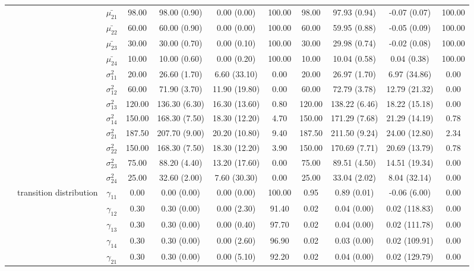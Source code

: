 \begin{table}[h]
{\begin{tabular}{ccccccccccc}
 &  & $\bar{\mu_{21}}$ & 98.00 & 98.00 (0.90) & 0.00 (0.00) & 100.00 & 98.00 & 97.93 (0.94) & -0.07 (0.07) & 100.00 \\
 &  & $\bar{\mu_{22}}$ & 60.00 & 60.00 (0.90) & 0.00 (0.00) & 100.00 & 60.00 & 59.95 (0.88) & -0.05 (0.09) & 100.00 \\
 &  & $\bar{\mu_{23}}$ & 30.00 & 30.00 (0.70) & 0.00 (0.10) & 100.00 & 30.00 & 29.98 (0.74) & -0.02 (0.08) & 100.00 \\
 &  & $\bar{\mu_{24}}$ & 10.00 & 10.00 (0.60) & 0.00 (0.20) & 100.00 & 10.00 & 10.04 (0.58) & 0.04 (0.38) & 100.00 \\
 &  & $\sigma^2_{11}$ & 20.00 & 26.60 (1.70) & 6.60 (33.10) & 0.00 & 20.00 & 26.97 (1.70) & 6.97 (34.86) & 0.00 \\
 &  & $\sigma^2_{12}$ & 60.00 & 71.90 (3.70) & 11.90 (19.80) & 0.00 & 60.00 & 72.79 (3.78) & 12.79 (21.32) & 0.00 \\
 &  & $\sigma^2_{13}$ & 120.00 & 136.30 (6.30) & 16.30 (13.60) & 0.80 & 120.00 & 138.22 (6.46) & 18.22 (15.18) & 0.00 \\
 &  & $\sigma^2_{14}$ & 150.00 & 168.30 (7.50) & 18.30 (12.20) & 4.70 & 150.00 & 171.29 (7.68) & 21.29 (14.19) & 0.78 \\
 &  & $\sigma^2_{21}$ & 187.50 & 207.70 (9.00) & 20.20 (10.80) & 9.40 & 187.50 & 211.50 (9.24) & 24.00 (12.80) & 2.34 \\
 &  & $\sigma^2_{22}$ & 150.00 & 168.30 (7.50) & 18.30 (12.20) & 3.90 & 150.00 & 170.69 (7.71) & 20.69 (13.79) & 0.78 \\
 &  & $\sigma^2_{23}$ & 75.00 & 88.20 (4.40) & 13.20 (17.60) & 0.00 & 75.00 & 89.51 (4.50) & 14.51 (19.34) & 0.00 \\
 &  & $\sigma^2_{24}$ & 25.00 & 32.60 (2.00) & 7.60 (30.30) & 0.00 & 25.00 & 33.04 (2.02) & 8.04 (32.14) & 0.00 \\
 & transition distribution & $\gamma_{11}$ & 0.00 & 0.00 (0.00) & 0.00 (0.00) & 100.00 & 0.95 & 0.89 (0.01) & -0.06 (6.00) & 0.00 \\
 & \multirow{15}{*}{} & $\gamma_{12}$ & 0.30 & 0.30 (0.00) & 0.00 (2.30) & 91.40 & 0.02 & 0.04 (0.00) & 0.02 (118.83) & 0.00 \\
 &  & $\gamma_{13}$ & 0.30 & 0.30 (0.00) & 0.00 (0.40) & 97.70 & 0.02 & 0.04 (0.00) & 0.02 (111.78) & 0.00 \\
 &  & $\gamma_{14}$ & 0.30 & 0.30 (0.00) & 0.00 (2.60) & 96.90 & 0.02 & 0.03 (0.00) & 0.02 (109.91) & 0.00 \\
 &  & $\gamma_{21}$ & 0.30 & 0.30 (0.00) & 0.00 (5.10) & 92.20 & 0.02 & 0.04 (0.00) & 0.02 (129.79) & 0.00 \\

\end{tabular}}
\end{table}

